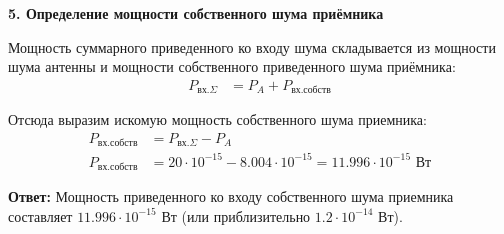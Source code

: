 \vspace{1em}
\textbf{5. Определение мощности собственного шума приёмника}

Мощность суммарного приведенного ко входу шума складывается из мощности шума антенны и мощности собственного приведенного шума приёмника:
\begin{align*}
P_{\text{вх.}\Sigma} &= P_A + P_{\text{вх.собств}}
\end{align*}

Отсюда выразим искомую мощность собственного шума приемника:
\begin{align*}
P_{\text{вх.собств}} &= P_{\text{вх.}\Sigma} - P_A \\
P_{\text{вх.собств}} &= 20 \cdot 10^{-15} - 8.004 \cdot 10^{-15} = 11.996 \cdot 10^{-15} \text{ Вт}
\end{align*}

\textbf{Ответ:} Мощность приведенного ко входу собственного шума приемника составляет $11.996 \cdot 10^{-15} \text{ Вт}$ (или приблизительно $1.2 \cdot 10^{-14} \text{ Вт}$).